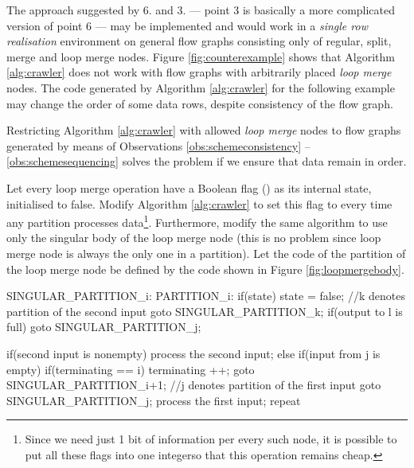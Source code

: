 The approach suggested by 6. and 3. --- point 3 is basically a more complicated version of point 6 --- may be implemented and would work in a \emph{single row realisation} environment on general flow graphs consisting only of regular, split, merge and loop merge nodes. Figure \ref{fig:counterexample} shows that Algorithm \ref{alg:crawler} does not work with flow graphs with arbitrarily placed \emph{loop merge} nodes. The code generated by Algorithm \ref{alg:crawler} for the following example may change the order of some data rows, despite consistency of the flow graph. 


Restricting Algorithm \ref{alg:crawler} with allowed \emph{loop merge} nodes to flow graphs generated by means of Observations \ref{obs:schemeconsistency} -- \ref{obs:schemesequencing} solves the problem if we ensure that data remain in order.

  Let every loop merge operation have a Boolean flag () as its internal state, initialised to false. Modify Algorithm \ref{alg:crawler} to set this flag to  every time any partition processes data\footnote{Since we need just 1 bit of information per every such node, it is possible to put all these flags into one integer\footnotemark so that this operation remains cheap.}. Furthermore, modify the same algorithm to use only the singular body of the loop merge node (this is no problem since loop merge node is always the only one in a partition). Let the code of the partition of the loop merge node be defined by the code shown in Figure \ref{fig:loopmergebody}.
\myenddef
\mybeginfigloose
\begin{code}
SINGULAR_PARTITION_i:
PARTITION_i:
if(state)
{
  state = false;
  //k denotes partition of the second input
  goto SINGULAR_PARTITION_k; 
}
if(output to l is full)
  goto SINGULAR_PARTITION_j;
\end{code}
\begin{code}
if(second input is nonempty)
{
  process the second input;
}
else
{
  if(input from j is empty)
  {
    if(terminating == i) 
    {
      terminating ++;
      goto SINGULAR_PARTITION_i+1;
    }
    //j denotes partition of the first input
    goto SINGULAR_PARTITION_j;
  }
  process the first input;
}
repeat
\end{code}

